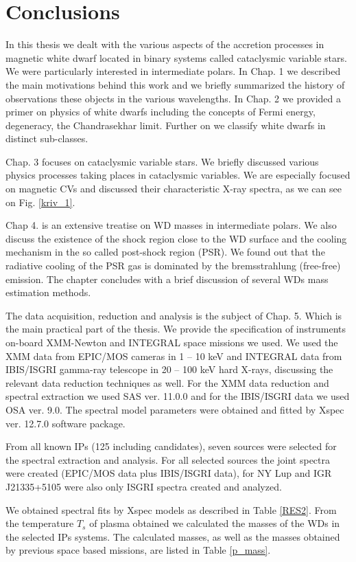 \documentclass[oneside,a4paper,11pt]{report}
\begin{document}
\chapter{Conclusions}
In this thesis we dealt with the various aspects of the accretion processes in magnetic white dwarf 
located in binary systems called cataclysmic variable stars. We were particularly interested in 
intermediate polars. In Chap. 1 we described the main motivations behind this work and we briefly 
summarized the history of observations these objects in the various wavelengths. In Chap. 2 we 
provided a primer on physics of white dwarfs including the concepts of Fermi energy, degeneracy, 
the Chandrasekhar limit. Further on we classify white dwarfs in distinct sub-classes. 

Chap. 3 focuses on cataclysmic variable stars. We briefly discussed various physics processes 
taking places in cataclysmic variables. We are especially focused on magnetic CVs and discussed 
their characteristic X-ray spectra, as we can see on Fig. \ref{kriv_1}.

Chap 4. is an extensive treatise on WD masses in intermediate polars. We also discuss the 
existence of the shock region close to the WD surface and the cooling mechanism in the so 
called post-shock region (PSR). We found out that the radiative cooling of the PSR gas is 
dominated by the bremsstrahlung (free-free) emission. The chapter concludes with a brief 
discussion of several WDs mass estimation methods.

The data acquisition, reduction and analysis is the subject of Chap. 5. Which is the main 
practical part of the thesis. We provide the specification of  instruments on-board 
XMM-Newton and INTEGRAL space missions we used. We used the XMM data from EPIC/MOS 
cameras in 1 – 10 keV and INTEGRAL data from IBIS/ISGRI gamma-ray telescope in 20 – 100 keV 
hard X-rays, discussing the relevant data reduction techniques as well. For the XMM data 
reduction and spectral extraction we used SAS ver. 11.0.0 and for the IBIS/ISGRI data we 
used OSA ver. 9.0. The spectral model parameters were obtained and fitted by Xspec ver. 
12.7.0 software package.

From all known IPs (125 including candidates), seven sources were selected for the spectral 
extraction and analysis. For all selected sources the joint spectra were created (EPIC/MOS
 data plus IBIS/ISGRI data), for NY Lup and IGR J21335+5105 were also only ISGRI spectra 
created and analyzed. 

We obtained spectral fits by Xspec models as described in Table \ref{RES2}. From the temperature 
$T_s$ of plasma obtained we calculated the masses of the WDs in the selected IPs systems. 
The calculated masses, as well as the masses obtained by previous space based missions, are 
listed in Table \ref{p_mass}.
\end{document}
